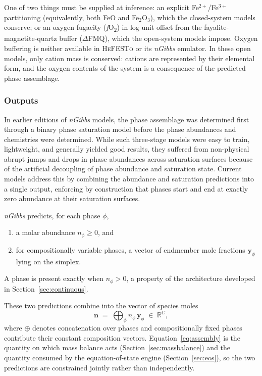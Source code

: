 One of two things must be supplied at inference: an explicit Fe$^{2+}$/Fe$^{3+}$
partitioning (equivalently, both FeO and Fe$_2$O$_3$), which the closed-system models
conserve; or an oxygen fugacity (\emph{f}O\textsubscript{2}) in log unit offset from the fayalite-magnetite-quartz buffer ($\Delta$FMQ), which the open-system models impose. Oxygen buffering is neither available in \textsc{HeFESTo} or its \emph{nGibbs} emulator. In these open models, only cation mass is conserved: cations are represented by their elemental form, and the oxygen contents of the system is a consequence of the predicted phase assemblage. 

\subsubsection{Outputs}

In earlier editions of \emph{nGibbs} models, the phase assemblage was determined first through a binary phase saturation model before the phase abundances and chemistries were determined. While such three-stage models were easy to train, lightweight, and generally yielded good results, they suffered from non-physical abrupt jumps and drops in phase abundances across saturation surfaces because of the artificial decoupling of phase abundance and saturation state. Current models address this by combining the abundance and saturation predictions into a single output, enforcing by construction that phases start and end at exactly zero abundance at their saturation surfaces.

\emph{nGibbs} predicts, for each phase $\phi$,
\begin{enumerate}
  \item a molar abundance $n_\phi \ge 0$, and
  \item for compositionally variable phases, a vector of endmember mole fractions
        $\mathbf{y}_\phi$ lying on the simplex.
\end{enumerate}

A phase is present exactly when $n_\phi > 0$, a property of the architecture developed in
Section~\ref{sec:continuous}. 

These two predictions combine into the vector of
species moles
\begin{equation}
  \mathbf{n} \;=\; \bigoplus_\phi n_\phi\, \mathbf{y}_\phi \;\in\;\mathbb{R}^{C},
  \label{eq:assembly}
\end{equation}
where $\oplus$ denotes concatenation over phases and compositionally fixed phases
contribute their constant composition vectors. Equation~\eqref{eq:assembly} is the
quantity on which mass balance acts (Section~\ref{sec:massbalance}) and the quantity
consumed by the equation-of-state engine (Section~\ref{sec:eos}), so the two
predictions are constrained jointly rather than independently.

